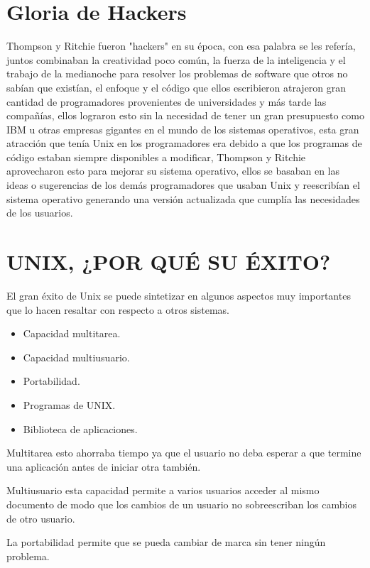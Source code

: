 \section*{Gloria de Hackers}
Thompson y Ritchie fueron "hackers" en su época, con esa palabra se les refería, juntos combinaban la creatividad poco común, la fuerza de la inteligencia y el trabajo de 
la medianoche para resolver los problemas de software que otros no sabían que existían, el enfoque y el código que ellos escribieron atrajeron gran cantidad de 
programadores provenientes de universidades y más tarde las  compañías, ellos lograron esto sin la necesidad de tener un gran presupuesto como IBM u otras empresas 
gigantes en el mundo de los sistemas operativos,  esta gran atracción que tenía Unix en los programadores era debido a que los programas de código estaban siempre  
disponibles a modificar, Thompson y Ritchie aprovecharon esto para mejorar su sistema operativo, ellos se basaban en las ideas o sugerencias de los demás programadores que 
usaban Unix y reescribían el sistema operativo generando una versión actualizada que cumplía las necesidades de los usuarios.

\section*{UNIX, ¿POR QUÉ SU ÉXITO?}
El gran éxito de Unix se puede sintetizar en algunos aspectos muy importantes que lo hacen resaltar con respecto a otros sistemas.

\begin{itemize}
	\item Capacidad multitarea.
	\item Capacidad multiusuario.
	\item Portabilidad.
	\item Programas de UNIX.
	\item Biblioteca de aplicaciones.
\end{itemize} 

Multitarea esto ahorraba tiempo ya que el usuario no deba esperar a que termine una aplicación antes de iniciar otra también.
 
Multiusuario esta capacidad permite a varios usuarios acceder al mismo documento de modo que los cambios de un usuario no sobreescriban los cambios de otro usuario.                                                                  

La portabilidad permite que se pueda cambiar de marca sin tener ningún problema.

